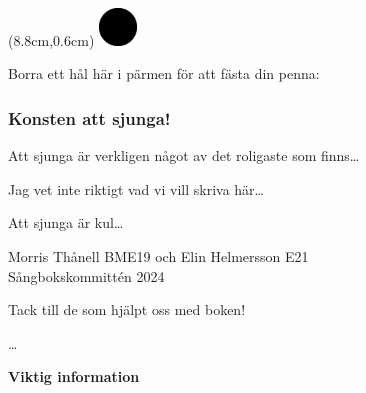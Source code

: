 
\begin{textblock*}{3cm}(8.8cm,0.6cm) %
   \includegraphics[width=1.0cm]{./bilder/cirkel.png}
\end{textblock*}

\vspace*{-8mm}
Borra ett hål här i pärmen för att fästa din penna: %

\subsubsection*{Konsten att sjunga!}
Att sjunga är verkligen något av det roligaste som finns\dots


Jag vet inte riktigt vad vi vill skriva här\dots

Att sjunga är kul\dots



Morris Thånell BME19 och Elin Helmersson E21\\
Sångbokskommittén 2024



\newpage

Tack till de som hjälpt oss med boken!

\dots

\newpage






\vspace*{-13mm} %
\enlargethispage{15mm} %




\begin{center}
    \textbf{Viktig information}
\end{center}


